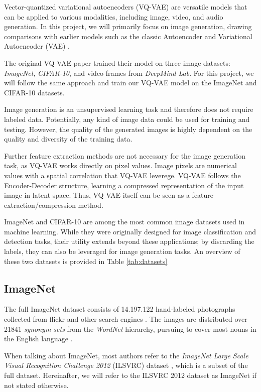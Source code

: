 Vector-quantized variational autoencoders (VQ-VAE) are versatile models that can be applied to various modalities, including image, video, and audio generation. In this project, we will primarily focus on image generation, drawing comparisons with earlier models such as the classic Autoencoder and Variational Autoencoder (VAE) \cite{vae}.

    The original VQ-VAE paper \cite{vqvae} trained their model on three image datasets: \textit{ImageNet}, \textit{CIFAR-10}, and video frames from \textit{DeepMind Lab}. For this project, we will follow the same approach and train our VQ-VAE model on the ImageNet and CIFAR-10 datasets.

    Image generation is an unsupervised learning task and therefore does not require labeled data. Potentially, any kind of image data could be used for training and testing. However, the quality of the generated images is highly dependent on the quality and diversity of the training data.

    Further feature extraction methods are not necessary for the image generation task, as VQ-VAE works directly on pixel values. Image pixels are numerical values with a spatial correlation that VQ-VAE leverege. VQ-VAE follows the Encoder-Decoder structure, learning a compressed representation of the input image in latent space. Thus, VQ-VAE itself can be seen as a feature extraction/compression method.

    ImageNet and CIFAR-10 are among the most common image datasets used in machine learning. While they were originally designed for image classification and detection tasks, their utility extends beyond these applications; by discarding the labels, they can also be leveraged for image generation tasks. An overview of these two datasets is provided in Table \ref{tab:datasets}

    \subsection{ImageNet}
    The full ImageNet dataset consists of 14.197.122 hand-labeled photographs collected from flickr and other search engines \cite{ILSVRC15}\cite{imagenet_breakdown}. The images are distributed over 21841 \textit{synonym sets} from the \textit{WordNet} \cite{wordnet} hierarchy, pursuing to cover most nouns in the English language \cite{imagenet_breakdown}.

    When talking about ImageNet, most authors refer to the \textit{ImageNet Large Scale Visual Recognition Challenge 2012} (ILSVRC) dataset \cite{ILSVRC15}, which is a subset of the full dataset. Hereinafter, we will refer to the ILSVRC 2012 dataset as ImageNet if not stated otherwise.


